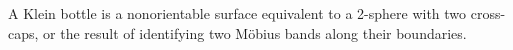A Klein bottle is a nonorientable surface equivalent to a 2-sphere with two cross-caps, or the result of identifying two Möbius bands along their boundaries.
